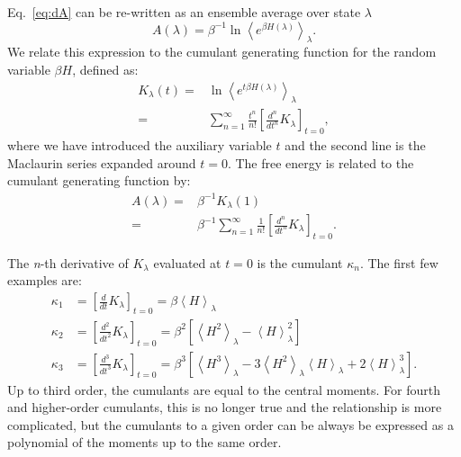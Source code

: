 \documentclass{article}
\begin{document}
Eq.~\ref{eq:dA} can be re-written as an ensemble average over state $\lambda$
\begin{equation}
 A(\lambda) =
	\beta^{-1} \ln \left\langle e^{\beta H(\lambda)} \right\rangle_\lambda.
\label{eq:avg_expr}
\end{equation}
We relate this expression to the cumulant generating function for the random variable $\beta H$, defined as:
\begin{align}
K_{\lambda}(t) =&
	\ln \left\langle 
    	e^{t \beta H(\lambda)}
    \right\rangle_\lambda \\
    =& 
    \sum_{n=1}^{\infty}
            	\frac{t^n}{n!}
                \left[ \frac{d^n}{dt^n} K_{\lambda}\right]_{t=0},
\end{align}
where we have introduced the auxiliary variable $t$ and the second line is the Maclaurin series expanded around $t=0$.
The free energy is related to the cumulant generating function by:
\begin{align}
 A(\lambda) =& \beta^{-1} K_{\lambda}(1) \nonumber\\
                  =& \beta^{-1} \sum_{n=1}^{\infty}
            			\frac{1}{n!}\left[
                        	\frac{d^n}{dt^n} K_{\lambda}
                        \right]_{t=0}.
\label{eq:cumu_dA}
\end{align}

The \textit{n}-th derivative of $K_{\lambda}$ evaluated at $t=0$ is the cumulant $\kappa_n$. The first few examples are:
\begin{align}
\kappa_1 &=
	\left[\frac{d}{dt} K_{\lambda}\right]_{t=0} =
	\beta \left\langle H \right\rangle_\lambda \nonumber\\
\kappa_2 &=
	\left[\frac{d^2}{dt^2} K_{\lambda}\right]_{t=0} =
	\beta^2 \left[
		\left\langle H^2 \right\rangle_\lambda -
    	\left\langle H \right\rangle_\lambda^2
    \right] \nonumber\\
\kappa_3 &=
	\left[\frac{d^3}{dt^3} K_{\lambda} \right]_{t=0} =
	\beta^3 \left[
		\left\langle H^3 \right\rangle_\lambda -
    	3 \left\langle H^2 \right\rangle_\lambda
    		\left\langle H \right\rangle_\lambda +
    	2 \left\langle H \right\rangle_\lambda^3
    \right].
\label{eq:cumu}
\end{align}
Up to third order, the cumulants are equal to the central moments. For fourth and higher-order cumulants, this is no longer true and the relationship is more complicated, but the cumulants to a given order can be always be expressed as a polynomial of the moments up to the same order.
\end{document}
